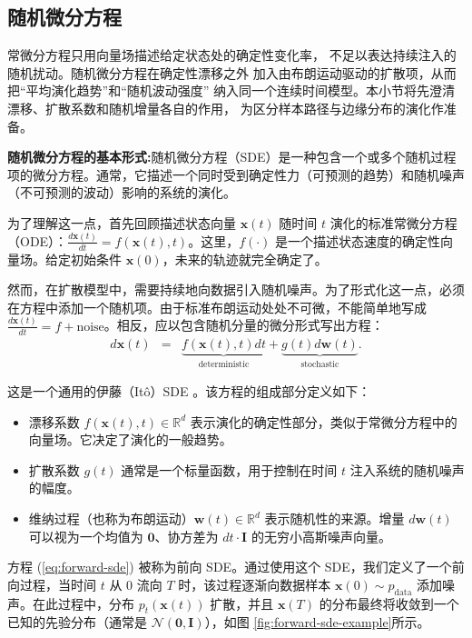 \documentclass[UTF8,a4paper,zihao=-4,oneside,openany]{ctexbook}
\begin{document}
\subsection{随机微分方程}

常微分方程只用向量场描述给定状态处的确定性变化率，
不足以表达持续注入的随机扰动。随机微分方程在确定性漂移之外
加入由布朗运动驱动的扩散项，从而把“平均演化趋势”和“随机波动强度”
纳入同一个连续时间模型。本小节将先澄清漂移、扩散系数和随机增量各自的作用，
为区分样本路径与边缘分布的演化作准备。

\textbf{随机微分方程的基本形式:}随机微分方程（SDE）是一种包含一个或多个随机过程项的微分方程。通常，它描述一个同时受到确定性力（可预测的趋势）和随机噪声（不可预测的波动）影响的系统的演化。

为了理解这一点，首先回顾描述状态向量 $\mathbf{x}(t)$ 随时间 $t$ 演化的标准常微分方程（ODE）：$\frac{d\mathbf{x}(t)}{dt} = f(\mathbf{x}(t), t)$。这里，$f(\cdot)$ 是一个描述状态速度的确定性向量场。给定初始条件 $\mathbf{x}(0)$，未来的轨迹就完全确定了。

然而，在扩散模型中，需要持续地向数据引入随机噪声。为了形式化这一点，必须在方程中添加一个随机项。由于标准布朗运动处处不可微，不能简单地写成 $\frac{d\mathbf{x}(t)}{dt} = f + \text{noise}$。相反，应以包含随机分量的微分形式写出方程：
\begin{eqnarray}
d\mathbf{x}(t) & = & \underbrace{f(\mathbf{x}(t), t) dt}_{\text{deterministic}} + \underbrace{g(t) d\mathbf{w}(t)}_{\text{stochastic}}.
\label{eq:forward-sde}
\end{eqnarray}

这是一个通用的伊藤（It{\^o}）SDE 。该方程的组成部分定义如下：

\begin{itemize}
\item 漂移系数 $f(\mathbf{x}(t), t) \in \mathbb{R}^d$ 表示演化的确定性部分，类似于常微分方程中的向量场。它决定了演化的一般趋势。
\item 扩散系数 $g(t)$ 通常是一个标量函数，用于控制在时间 $t$ 注入系统的随机噪声的幅度。
\item 维纳过程（也称为布朗运动）$\mathbf{w}(t) \in \mathbb{R}^d$ 表示随机性的来源。增量 $d\mathbf{w}(t)$ 可以视为一个均值为 $\mathbf{0}$、协方差为 $dt \cdot \mathbf{I}$ 的无穷小高斯噪声向量。
\end{itemize}

方程 (\ref{eq:forward-sde}) 被称为前向 SDE。通过使用这个 SDE，我们定义了一个前向过程，当时间 $t$ 从 $0$ 流向 $T$ 时，该过程逐渐向数据样本 $\mathbf{x}(0) \sim p_{\text{data}}$ 添加噪声。在此过程中，分布 $p_t(\mathbf{x}(t))$ 扩散，并且 $\mathbf{x}(T)$ 的分布最终将收敛到一个已知的先验分布（通常是 $\mathcal{N}(\mathbf{0}, \mathbf{I})$），如图 \ref{fig:forward-sde-example}所示。
\end{document}
